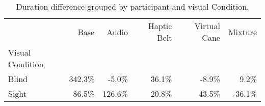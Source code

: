 
\begin{table}[!htb]
\centering
\caption{Duration difference grouped by participant and visual Condition.}
\label{tab:duracao_var_group}
\begin{tabular}{lrrrrr}
\toprule
{} &    Base &   Audio & Haptic Belt & Virtual Cane & Mixture \\
Visual Condition &         &         &             &              &         \\
\midrule
Blind            &  342.3\% &   -5.0\% &       36.1\% &        -8.9\% &    9.2\% \\
Sight            &   86.5\% &  126.6\% &       20.8\% &        43.5\% &  -36.1\% \\
\bottomrule
\end{tabular}
\end{table}

